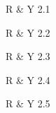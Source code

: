 \documentclass[minion]{homework}
\begin{document}
\begin{aproblems}

\hproblem R \& Y 2.1

\hproblem R \& Y 2.2

\hproblem R \& Y 2.3

\hproblem R \& Y 2.4

\hproblem R \& Y 2.5

\end{aproblems}
\end{document}
